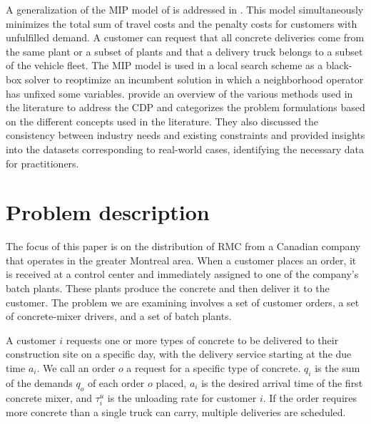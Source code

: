 \documentclass{article}
\begin{document}
A generalization of the MIP model of \cite{kinable2014concrete} is addressed in \cite{asbach2009analysis}. This model simultaneously minimizes the total sum of travel costs and the penalty costs for customers with unfulfilled demand. A customer can request that all concrete deliveries come from the same plant or a subset of plants and that a delivery truck belongs to a subset of the vehicle fleet. The MIP model is used in a local search scheme as a black-box solver to reoptimize an incumbent solution in which a neighborhood operator has unfixed some variables. \cite{tzanetos2023systematic} provide an overview of the various methods used in the literature to address the CDP and categorizes the problem formulations based on the different concepts used in the literature. They also discussed the consistency between industry needs and existing constraints and provided insights into the datasets corresponding to real-world cases, identifying the necessary data for practitioners.

\section{Problem description}
\label{desc_form}
The focus of this paper is on the distribution of RMC from a Canadian company that operates in the greater Montreal area. When a customer places an order, it is received at a control center and immediately assigned to one of the company's batch plants. These plants produce the concrete and then deliver it to the customer. The problem we are examining involves a set of customer orders, a set of concrete-mixer drivers, and a set of batch plants.


A customer $i$ requests one or more types of concrete to be delivered to their construction site on a specific day, with the delivery service starting at the due time $a_i$.  We call an order $o$ a request for a specific type of concrete. $q_i$ is the sum of the demands $q_o$ of each order $o$ placed, $a_i$ is the desired arrival time of the first concrete mixer, and $\tau^u_i$ is the unloading rate for customer $i$. If the order requires more concrete than a single truck can carry, multiple deliveries are scheduled.
\end{document}
